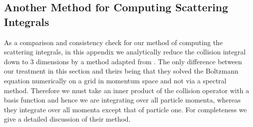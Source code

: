 \begin{subappendices}

\section{Another Method for Computing Scattering Integrals}\label{app:dogov_method}
As a comparison and consistency check for our method of computing the scattering integrals, in this appendix we analytically reduce the collision integral down to $3$ dimensions by a method adapted from \cite{Dolgov_Hansen}.  The only difference between our treatment in this section and theirs being that they solved the Boltzmann equation numerically on a grid in momentum space and not via a spectral method.  Therefore we must take an inner product of the collision operator with a basis function and hence we are integrating over all particle momenta, whereas they integrate over all momenta except that of particle one.  For completeness we give a detailed discussion of their method.


\end{subappendices}
